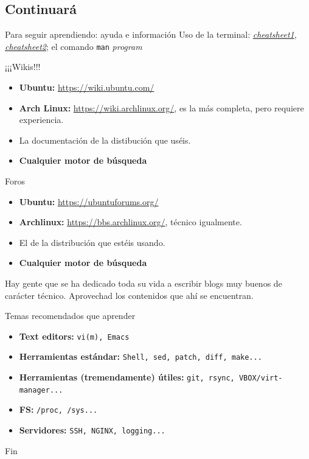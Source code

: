 \documentclass[12pt]{beamer}
\begin{document}
\subsection{Continuará}
\begin{frame}[allowframebreaks]{Para seguir aprendiendo: ayuda e información}
	Uso de la terminal: \href{http://www.cheat-sheets.org/saved-copy/fwunixref.pdf}{\textit{cheatsheet1}}, \href{http://images.linoxide.com/linux-cheat-sheet.pdf}{\textit{cheatsheet2}}; el comando \texttt{man} \textit{program}
	\begin{block}{¡¡¡Wikis!!!}
		\begin{itemize}
			\item \textbf{Ubuntu:} \href{https://wiki.ubuntu.com/}{https://wiki.ubuntu.com/}
			\item \textbf{Arch Linux:} \href{https://wiki.archlinux.org/}{https://wiki.archlinux.org/}, es la más completa, pero requiere experiencia.
			\item La documentación de la distibución que uséis.
			\item \textbf{Cualquier motor de búsqueda}
		\end{itemize}
	\end{block}
	\begin{block}{Foros}
		\begin{itemize}
			\item \textbf{Ubuntu:} \href{https://ubuntuforums.org/}{https://ubuntuforums.org/}
			\item \textbf{Archlinux:} \href{https://bbs.archlinux.org/}{https://bbs.archlinux.org/}, técnico igualmente.
			\item El de la distribución que estéis usando.
			\item \textbf{Cualquier motor de búsqueda}
		\end{itemize}
	\end{block}
	Hay gente que se ha dedicado toda su vida a escribir blogs muy buenos de carácter técnico. Aprovechad los contenidos que ahí se encuentran.
\end{frame}

\begin{frame}{Temas recomendados que aprender}
	\begin{itemize}
		\item \textbf{Text editors:} \texttt{vi(m), Emacs}
		\item \textbf{Herramientas estándar:} \texttt{Shell, sed, patch, diff, make...}
		\item \textbf{Herramientas (tremendamente) útiles:} \texttt{git, rsync, VBOX/virt-manager...}
		\item \textbf{FS:} \texttt{/proc, /sys...}
		\item \textbf{Servidores:} \texttt{SSH, NGINX, logging...}
	\end{itemize}
\end{frame}

\begin{frame}{Fin}
	
\end{frame}
\end{document}
